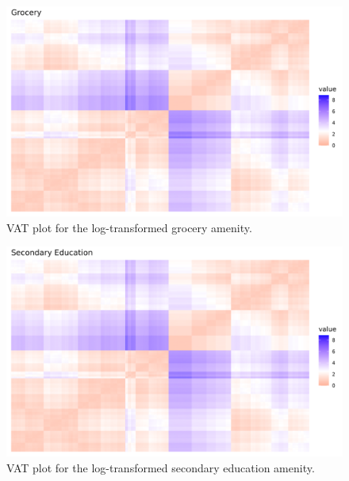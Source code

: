 \documentclass[11pt, a4paper]{article}
\begin{document}
\begin{figure}[H]
\centering
\includegraphics[width=\textwidth]{./vat/grocery_vat_log.png}
\caption[Grocery VAT plot]{VAT plot for the log-transformed grocery amenity.}\label{groceryvat}
\end{figure}








\begin{figure}[H]
\centering
\includegraphics[width=\textwidth]{./vat/secondaryeducation_vat_log.png}
\caption[Secondary education VAT plot]{VAT plot for the log-transformed secondary education amenity.}\label{seceducvat}
\end{figure}
\end{document}
